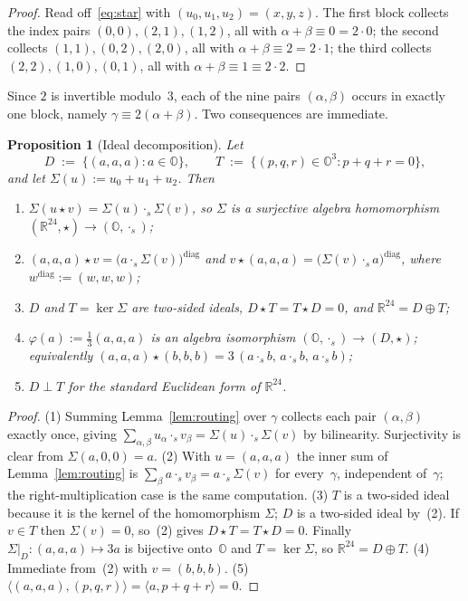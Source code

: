 \documentclass[11pt]{amsart}
\newcommand{\OO}{\mathbb{O}}
\newcommand{\RR}{\mathbb{R}}
\newcommand{\ip}[2]{\langle #1, #2 \rangle}
\newtheorem{proposition}[theorem]{Proposition}
\theoremstyle{definition}
\theoremstyle{remark}
\begin{document}
\begin{proof}
Read off~\eqref{eq:star} with $(u_0,u_1,u_2) = (x,y,z)$. The first block
collects the index pairs $(0,0), (2,1), (1,2)$, all with
$\alpha + \beta \equiv 0 = 2\cdot 0$; the second collects
$(1,1), (0,2), (2,0)$, all with $\alpha + \beta \equiv 2 = 2 \cdot 1$; the
third collects $(2,2), (1,0), (0,1)$, all with
$\alpha + \beta \equiv 1 \equiv 2 \cdot 2$.
\end{proof}

Since $2$ is invertible modulo~$3$, each of the nine pairs $(\alpha,\beta)$
occurs in exactly one block, namely $\gamma \equiv 2(\alpha+\beta)$. Two
consequences are immediate.

\begin{proposition}[Ideal decomposition]\label{prop:ideals}
Let
\[
  D \;:=\; \{(a,a,a) : a \in \OO\}, \qquad
  T \;:=\; \{(p,q,r) \in \OO^3 : p + q + r = 0\},
\]
and let $\Sigma(u) := u_0 + u_1 + u_2$. Then
\begin{enumerate}[label=(\arabic*)]
\item $\Sigma(u \star v) = \Sigma(u) \cdot_s \Sigma(v)$, so $\Sigma$ is a
  surjective algebra homomorphism $(\RR^{24}, \star) \to (\OO, \cdot_s)$;
\item $(a,a,a) \star v = \bigl(a \cdot_s \Sigma(v)\bigr)^{\mathrm{diag}}$
  and $v \star (a,a,a) = \bigl(\Sigma(v) \cdot_s a\bigr)^{\mathrm{diag}}$,
  where $w^{\mathrm{diag}} := (w,w,w)$;
\item $D$ and $T = \ker \Sigma$ are two-sided ideals,
  $D \star T = T \star D = 0$, and $\RR^{24} = D \oplus T$;
\item $\varphi(a) := \tfrac13 (a,a,a)$ is an algebra isomorphism
  $(\OO, \cdot_s) \to (D, \star)$; equivalently
  $(a,a,a) \star (b,b,b) = 3\,(a \cdot_s b,\, a \cdot_s b,\, a \cdot_s b)$;
\item $D \perp T$ for the standard Euclidean form of $\RR^{24}$.
\end{enumerate}
\end{proposition}

\begin{proof}
(1) Summing Lemma~\ref{lem:routing} over $\gamma$ collects each pair
$(\alpha,\beta)$ exactly once, giving
$\sum_{\alpha,\beta} u_\alpha \cdot_s v_\beta
 = \Sigma(u) \cdot_s \Sigma(v)$ by bilinearity. Surjectivity is clear from
$\Sigma(a,0,0) = a$.
(2) With $u = (a,a,a)$ the inner sum of Lemma~\ref{lem:routing} is
$\sum_{\beta} a \cdot_s v_\beta = a \cdot_s \Sigma(v)$ for every~$\gamma$,
independent of~$\gamma$; the right-multiplication case is the same
computation.
(3) $T$ is a two-sided ideal because it is the kernel of the homomorphism
$\Sigma$; $D$ is a two-sided ideal by~(2). If $v \in T$ then $\Sigma(v)=0$,
so~(2) gives $D \star T = T \star D = 0$. Finally
$\Sigma|_D : (a,a,a) \mapsto 3a$ is bijective onto~$\OO$ and $T = \ker\Sigma$,
so $\RR^{24} = D \oplus T$.
(4) Immediate from~(2) with $v = (b,b,b)$.
(5) $\ip{(a,a,a)}{(p,q,r)} = \ip{a}{p+q+r} = 0$.
\end{proof}
\end{document}
